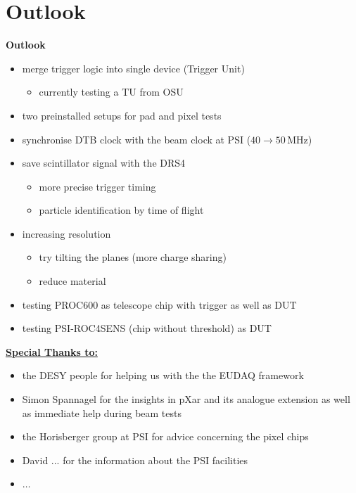 \documentclass[9pt]{beamer}
\begin{document}
\section{Outlook}
\begin{frame}
	\begin{alertblock}{
		\centering
		\Large{\textbf{Outlook}}}		                        
	\end{alertblock}
	\begin{itemize}
		\setlength{\itemsep}{\fill}
		\item merge trigger logic into single device (Trigger Unit)
		\begin{itemize}
			\item currently testing a TU from OSU
		\end{itemize}
		\item two preinstalled setups for pad and pixel tests
		\item synchronise DTB clock with the beam clock at PSI ($40\rightarrow50$\,MHz)
		\item save scintillator signal with the DRS4
		\begin{itemize}
			\item more precise trigger timing
			\item particle identification by time of flight
		\end{itemize}
		\item increasing resolution
		\begin{itemize}
			\item try tilting the planes (more charge sharing)
			\item reduce material
		\end{itemize}
		\item testing PROC600 as telescope chip with trigger as well as DUT
		\item testing PSI-ROC4SENS (chip without threshold) as DUT
	\end{itemize}
\end{frame}
\begin{frame}
	\underline{\textbf{Special Thanks to:}}\as
	\begin{itemize}
		\setlength{\itemsep}{\fill}
		\item the DESY people for helping us with the the EUDAQ framework
		\item Simon Spannagel for the insights in pXar and its analogue extension as well as immediate help during beam tests
		\item the Horisberger group at PSI for advice concerning the pixel chips
		\item David ... for the information about the PSI facilities
		\item $\hdots$
	\end{itemize}
\end{frame}
\end{document}
